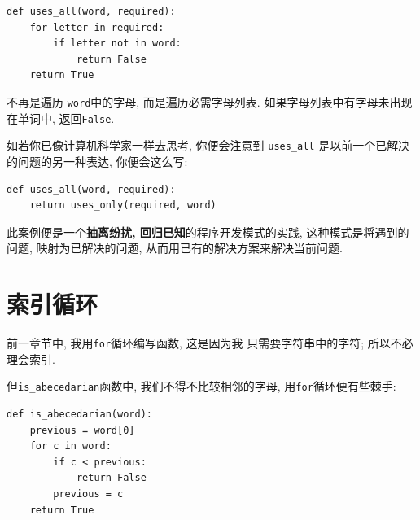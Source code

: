 \documentclass[10pt]{book}
\begin{document}
\begin{verbatim}
def uses_all(word, required):
    for letter in required: 
        if letter not in word:
            return False
    return True
\end{verbatim}
%
不再是遍历 {\tt word}中的字母, 
而是遍历必需字母列表. 
如果字母列表中有字母未出现在单词中, 返回{\tt False}.

如若你已像计算机科学家一样去思考, 你便会注意到 \verb"uses_all" 
是以前一个已解决的问题的另一种表达, 你便会这么写:

\begin{verbatim}
def uses_all(word, required):
    return uses_only(required, word)
\end{verbatim}
%
此案例便是一个{\bf 抽离纷扰, 回归已知}的程序开发模式的实践, 
这种模式是将遇到的问题, 映射为已解决的问题, 
从而用已有的解决方案来解决当前问题.   


\section{索引循环}
前一章节中, 我用{\tt for}循环编写函数, 这是因为我
只需要字符串中的字符; 所以不必理会索引. 

但\verb"is_abecedarian"函数中, 我们不得不比较相邻的字母, 
用{\tt for}循环便有些棘手:

\begin{verbatim}
def is_abecedarian(word):
    previous = word[0]
    for c in word:
        if c < previous:
            return False
        previous = c
    return True
\end{verbatim}
\end{document}
